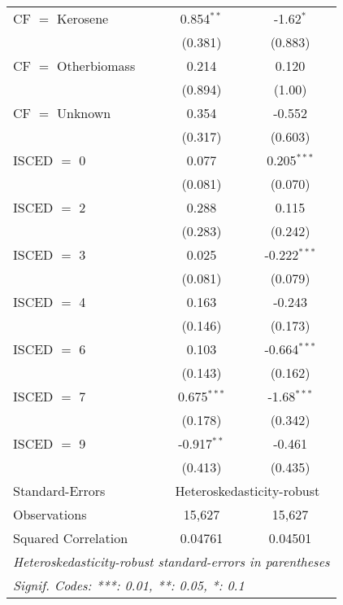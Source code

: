 \begin{table}[htbp!]
\begin{adjustbox}{width = 1\textwidth, max height = 0.95\textheight, center}
\begin{threeparttable}[b]
\begin{tabular}{lcc}
            CF $=$ Kerosene      & 0.854$^{**}$   & -1.62$^{*}$\\   
                                 & (0.381)        & (0.883)\\   
            CF $=$ Otherbiomass  & 0.214          & 0.120\\   
                                 & (0.894)        & (1.00)\\   
            CF $=$ Unknown       & 0.354          & -0.552\\   
                                 & (0.317)        & (0.603)\\   
            ISCED $=$ 0          & 0.077          & 0.205$^{***}$\\   
                                 & (0.081)        & (0.070)\\   
            ISCED $=$ 2          & 0.288          & 0.115\\   
                                 & (0.283)        & (0.242)\\   
            ISCED $=$ 3          & 0.025          & -0.222$^{***}$\\   
                                 & (0.081)        & (0.079)\\   
            ISCED $=$ 4          & 0.163          & -0.243\\   
                                 & (0.146)        & (0.173)\\   
            ISCED $=$ 6          & 0.103          & -0.664$^{***}$\\   
                                 & (0.143)        & (0.162)\\   
            ISCED $=$ 7          & 0.675$^{***}$  & -1.68$^{***}$\\   
                                 & (0.178)        & (0.342)\\   
            ISCED $=$ 9          & -0.917$^{**}$  & -0.461\\   
                                 & (0.413)        & (0.435)\\   
            \midrule 
            Standard-Errors & \multicolumn{2}{c}{Heteroskedasticity-robust} \\ 
            Observations         & 15,627         & 15,627\\  
            Squared Correlation  & 0.04761        & 0.04501\\  
            \midrule \midrule
            \multicolumn{3}{l}{\emph{Heteroskedasticity-robust standard-errors in parentheses}}\\
            \multicolumn{3}{l}{\emph{Signif. Codes: ***: 0.01, **: 0.05, *: 0.1}}\\
         \end{tabular}
         

\end{threeparttable}
\end{adjustbox}
\end{table}
